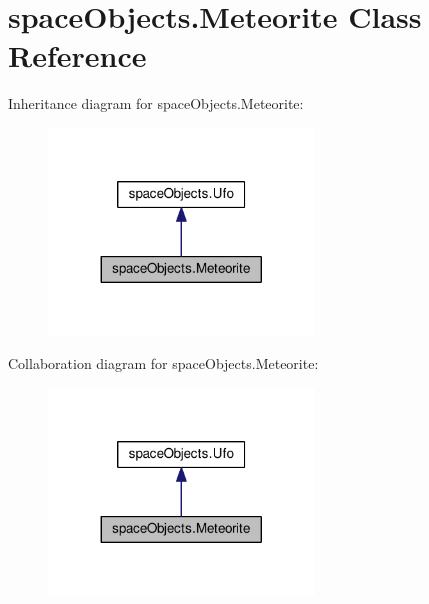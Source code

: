\hypertarget{classspace_objects_1_1_meteorite}{}\section{space\+Objects.\+Meteorite Class Reference}
\label{classspace_objects_1_1_meteorite}


Inheritance diagram for space\+Objects.\+Meteorite\+:\nopagebreak
\begin{figure}[H]
\begin{center}
\leavevmode
\includegraphics[width=200pt]{classspace_objects_1_1_meteorite__inherit__graph}
\end{center}
\end{figure}


Collaboration diagram for space\+Objects.\+Meteorite\+:\nopagebreak
\begin{figure}[H]
\begin{center}
\leavevmode
\includegraphics[width=200pt]{classspace_objects_1_1_meteorite__coll__graph}
\end{center}
\end{figure}
